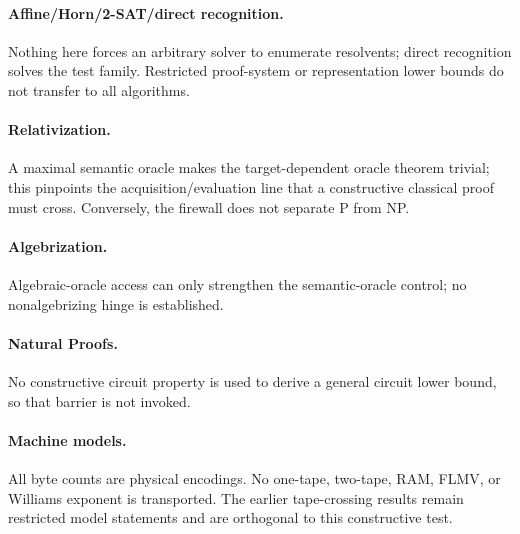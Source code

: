 \documentclass[11pt]{article}
\begin{document}
\paragraph{Affine/Horn/2-SAT/direct recognition.} Nothing here forces an
arbitrary solver to enumerate resolvents; direct recognition solves the test
family.  Restricted proof-system or representation lower bounds do not
transfer to all algorithms.
\paragraph{Relativization.} A maximal semantic oracle makes the target-dependent
oracle theorem trivial; this pinpoints the acquisition/evaluation line that a
constructive classical proof must cross.  Conversely, the firewall does not
separate P from NP.
\paragraph{Algebrization.} Algebraic-oracle access can only strengthen the
semantic-oracle control; no nonalgebrizing hinge is established.
\paragraph{Natural Proofs.} No constructive circuit property is used to derive
a general circuit lower bound, so that barrier is not invoked.
\paragraph{Machine models.} All byte counts are physical encodings.  No
one-tape, two-tape, RAM, FLMV, or Williams exponent is transported.  The earlier
tape-crossing results remain restricted model statements and are orthogonal to
this constructive test.
\end{document}
